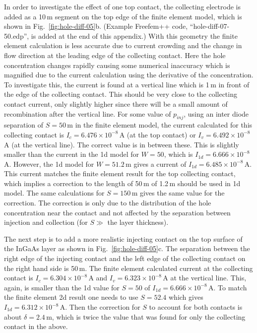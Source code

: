 In order to investigate the effect of one top contact, the collecting
electrode is added as a 10\,\textmu m segment on the top edge of the
finite element model, which is shown in Fig.~\ref{fig:hole-diff-05}b.
(Example Freefem++ code, ``hole-diff-07-50.edp'', is added at the
end of this appendix.)
With this geometry the finite element calculation is less accurate due
to current crowding and the change in flow direction
 at the leading edge of the collecting contact.
Here the hole concentration changes rapidly causing some numerical inaccuracy which
is magnified due to the current calculation using the derivative
of the concentration.
To investigate this, the current is found at a vertical line which is
1\,\textmu m in front of the edge of the collecting contact.
This should be very close to the collecting contact current, only
slightly higher since there will be a small amount of recombination
after the vertical line. 
For some value of $p_{inj}$, using an inter diode separation of
 $S=50$\,\textmu m in the finite element
model, the current calculated for this collecting contact is
 $I_c=6.476\times10^{-8}$\,A (at the top contact)
 or $I_v=6.492\times10^{-8}$\,A (at the vertical line).
The correct value is in between these.
This is slightly smaller than the current
in the 1d model for $W=50$, which is $I_{1d}=6.666\times10^{-8}$\,A.
However,  the 1d model for $W=51.2$\,\textmu m gives a current of
$I_{1d}=6.485\times10^{-8}$\,A.  This current matches the finite
element result for the top collecting contact, which implies a correction
to the length of 50\,\textmu m of 1.2\,\textmu m should be used in 1d model.
The same calculations for $S=150$\,\textmu m gives the same value
for the correction.  The correction is  only due to the distribution of the
hole concentration near the contact and not affected by the separation
between injection and collection (for $S\gg$ the layer thickness).

The next step is to add a more realistic injecting contact on the top surface
of the InGaAs layer as shown in Fig.~\ref{fig:hole-diff-05}c.
The separation between the right edge of the injecting contact and the
left edge of the collecting contact on the right hand side is 
50\,\textmu m.  The finite element calculated current at the collecting
contact is $I_c=6.304\times10^{-8}$\,A and $I_v=6.323\times10^{-8}$\,A
at the vertical line.
  This, again, is smaller than the
1d value for $S=50$ of $I_{1d}=6.666\times10^{-8}$\,A.
To match the finite element 2d result one needs to use $S=52.4$ which
gives $I_{1d}=6.312\times10^{-8}$\,A.
Then the correction for $S$ to account for both contacts is about
$\delta=2.4$\,\textmu m, which is twice the value that was found for
only the collecting contact in the above.


